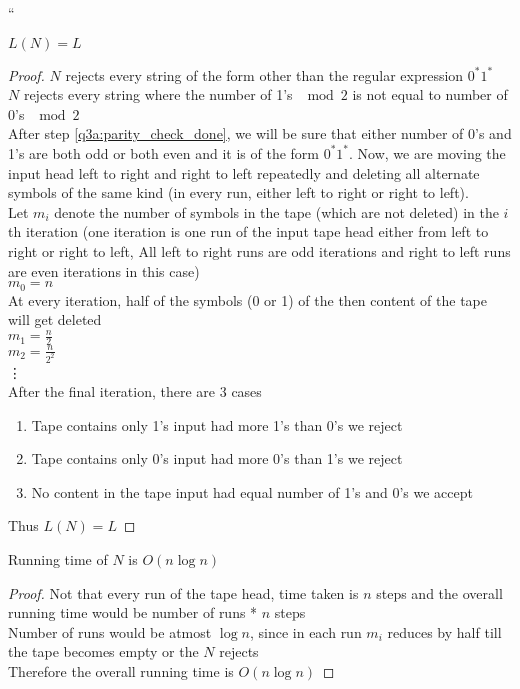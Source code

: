 ``

\begin{claim}
    $L(N) = L$
\end{claim}
\begin{proof}
    $N$ rejects every string of the form other than the regular expression $0^* 1^*$\\
    $N$ rejects every string where the number of 1's $\mod 2$ is not equal to number of 0's $\mod 2$\\
    After step \ref{q3a:parity_check_done}, we will be sure that either number of 0's and 1's are both odd or both even and it is of the form $0^*1^*$.
    Now, we are moving the input head left to right and right to left repeatedly and deleting all alternate symbols of the same kind (in every run, either left to right or right to left).\\
    Let $m_i$ denote the number of symbols in the tape (which are not deleted) in the $i$th iteration (one iteration is one run of the input tape head either from left to right or right to left, \imp All left to right runs are odd iterations and right to left runs are even iterations in this case)\\
    $m_0 = n$\\
    At every iteration, half of the symbols (0 or 1) of the then content of the tape will get deleted \\
    $m_1 = \frac{n}{2}$\\
    $m_2 = \frac{n}{2^2}$\\
    \vdots\\
    After the final iteration, there are 3 cases
    \begin{enumerate}
        \item Tape contains only 1's \imp input had more 1's than 0's \imp we reject
        \item Tape contains only 0's \imp input had more 0's than 1's \imp we reject
        \item No content in the tape \imp input had equal number of 1's and 0's \imp we accept
    \end{enumerate}
    Thus $L(N) = L$
\end{proof}

\begin{claim}
    Running time of $N$ is $O(n \log n)$
\end{claim}
\begin{proof}
    Not that every run of the tape head, time taken is $n$ steps and the overall running time would be number of runs * $n$ steps\\
    Number of runs would be atmost $\log n$, since in each run $m_i$ reduces by half till the tape becomes empty or the $N$ rejects\\
    Therefore the overall running time is $O(n \log n)$
\end{proof}












